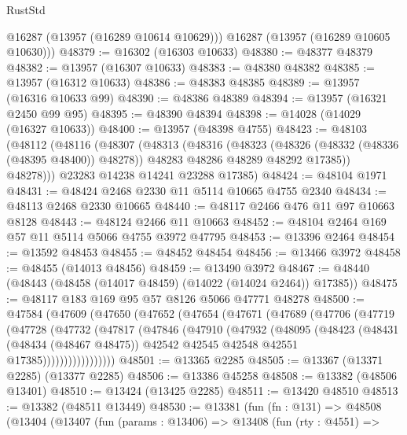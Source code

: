 \begin{lexlean}{RustStd}
\begin{coremodule}
        @16287
        (@13957 (@16289 @10614 @10629)))
      @16287
      (@13957 (@16289 @10605 @10630)))
@48379 := @16302 (@16303 @10633)
@48380 := @48377 @48379
@48382 := @13957 (@16307 @10633)
@48383 := @48380 @48382
@48385 := @13957 (@16312 @10633)
@48386 := @48383 @48385
@48389 := @13957 (@16316 @10633 @99)
@48390 := @48386 @48389
@48394 := @13957 (@16321 @2450 @99 @95)
@48395 := @48390 @48394
@48398 := @14028 (@14029 (@16327 @10633))
@48400 := @13957 (@48398 @4755)
@48423 := @48103
    (@48112
      (@48116
        (@48307
          (@48313
            (@48316
              (@48323
                (@48326 (@48332 (@48336 (@48395 @48400)) @48278))
                @48283
                @48286
                @48289
                @48292
                @17385))
            @48278)))
      @23283
      @14238
      @14241
      @23288
      @17385)
@48424 := @48104 @1971
@48431 := @48424 @2468 @2330 @11 @5114 @10665 @4755 @2340
@48434 := @48113 @2468 @2330 @10665
@48440 := @48117 @2466 @476 @11 @97 @10663 @8128
@48443 := @48124 @2466 @11 @10663
@48452 := @48104 @2464 @169 @57 @11 @5114 @5066 @4755 @3972 @47795
@48453 := @13396 @2464
@48454 := @13592 @48453
@48455 := @48452 @48454
@48456 := @13466 @3972
@48458 := @48455 (@14013 @48456)
@48459 := @13490 @3972
@48467 := @48440 (@48443 (@48458 (@14017 @48459) (@14022 (@14024 @2464)) @17385))
@48475 := @48117 @183 @169 @95 @57 @8126 @5066 @47771 @48278
@48500 := @47584
    (@47609
      (@47650
        (@47652
          (@47654
            (@47671
              (@47689
                (@47706
                  (@47719
                    (@47728
                      (@47732
                        (@47817
                          (@47846
                            (@47910
                              (@47932
                                (@48095
                                  (@48423
                                    (@48431
                                      (@48434 (@48467 @48475))
                                      @42542
                                      @42545
                                      @42548
                                      @42551
                                      @17385)))))))))))))))))
@48501 := @13365 @2285
@48505 := @13367 (@13371 @2285) (@13377 @2285)
@48506 := @13386 @45258
@48508 := @13382 (@48506 @13401)
@48510 := @13424 (@13425 @2285)
@48511 := @13420 @48510
@48513 := @13382 (@48511 @13449)
@48530 := @13381
    (fun (fn : @131) =>
    @48508
      (@13404
        (@13407
          (fun (params : @13406) =>
          @13408
            (fun (rty : @4551) =>

\end{coremodule}
\end{lexlean}
